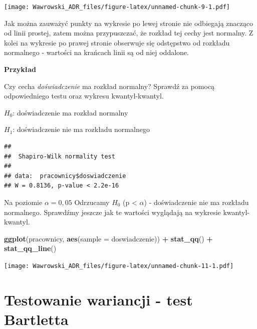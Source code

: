 \documentclass[
]{book}
\newenvironment{Shaded}{\begin{snugshade}}{\end{snugshade}}
\newcommand{\DataTypeTok}[1]{\textcolor[rgb]{0.13,0.29,0.53}{#1}}
\newcommand{\KeywordTok}[1]{\textcolor[rgb]{0.13,0.29,0.53}{\textbf{#1}}}
\newcommand{\NormalTok}[1]{#1}
\newcommand{\OperatorTok}[1]{\textcolor[rgb]{0.81,0.36,0.00}{\textbf{#1}}}
\newcommand{\StringTok}[1]{\textcolor[rgb]{0.31,0.60,0.02}{#1}}
\begin{document}
\texttt{[image: Wawrowski\_ADR\_files/figure-latex/unnamed-chunk-9-1.pdf]}

Jak można zauważyć punkty na wykresie po lewej stronie nie odbiegają znacząco od linii prostej, zatem można przypuszczać, że rozkład tej cechy jest normalny. Z kolei na wykresie po prawej stronie obserwuje się odstępstwo od rozkładu normalnego - wartości na krańcach linii są od niej oddalone.

\textbf{Przykład}

Czy cecha \emph{doświadczenie} ma rozkład normalny? Sprawdź za pomocą odpowiedniego testu oraz wykresu kwantyl-kwantyl.

\(H_0\): doświadczenie ma rozkład normalny

\(H_1\): doświadczenie nie ma rozkładu normalnego

\begin{Shaded}
\end{Shaded}

\begin{verbatim}
## 
##  Shapiro-Wilk normality test
## 
## data:  pracownicy$doswiadczenie
## W = 0.8136, p-value < 2.2e-16
\end{verbatim}

Na poziomie \(\alpha = 0,05\) Odrzucamy \(H_0\) (p \textless{} \(\alpha\)) - doświadczenie nie ma rozkładu normalnego. Sprawdźmy jeszcze jak te wartości wyglądają na wykresie kwantyl-kwantyl.

\begin{Shaded}
\begin{Highlighting}[]
\KeywordTok{ggplot}\NormalTok{(pracownicy, }\KeywordTok{aes}\NormalTok{(}\DataTypeTok{sample =}\NormalTok{ doswiadczenie)) }\OperatorTok{+}
\StringTok{  }\KeywordTok{stat_qq}\NormalTok{() }\OperatorTok{+}
\StringTok{  }\KeywordTok{stat_qq_line}\NormalTok{()}
\end{Highlighting}
\end{Shaded}

\texttt{[image: Wawrowski\_ADR\_files/figure-latex/unnamed-chunk-11-1.pdf]}

\hypertarget{testowanie-wariancji---test-bartletta}{%
\section{Testowanie wariancji - test Bartletta}\label{testowanie-wariancji---test-bartletta}}
\end{document}
